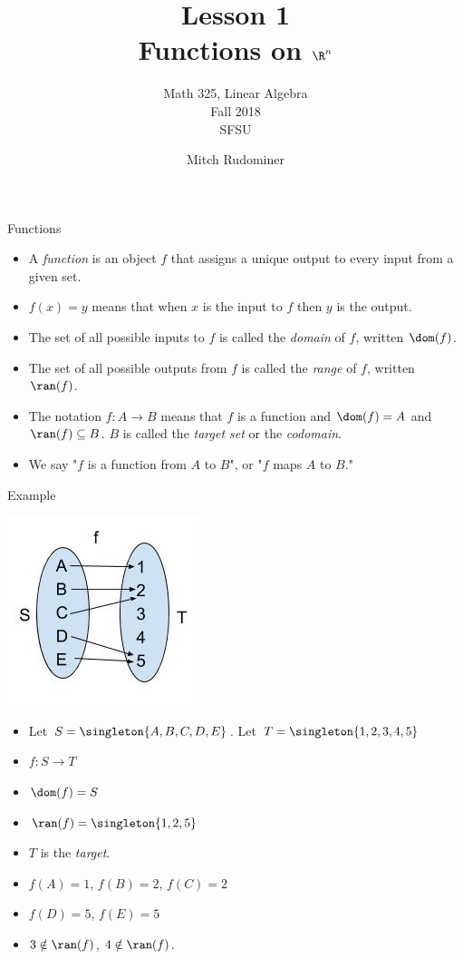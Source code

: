 \documentclass{beamer}
\title{Lesson 1 \\ Functions on $\R^n$}
\subtitle{Math 325, Linear Algebra \\ Fall 2018 \\ SFSU}
\author{Mitch Rudominer}
\date{}
\begin{document}
\begin{frame}
  \titlepage
\end{frame}


\begin{frame}{Functions}

  \begin{itemize}
  \item  A \emph{function} is an object $f$ that assigns a unique output
  to every input from a given set.
  \item $f(x) = y$ means that when $x$ is the input to $f$ then $y$ is the output.
  \item The set of all possible inputs to $f$ is called the \emph{domain} of $f$,
  written $\dom(f)$.
  \item The set of all possible outputs from $f$ is called the \emph{range} of $f$,
  written $\ran(f)$.
  \item The notation $f:A \to B$ means that $f$ is a function and
  $\dom(f)=A$ and $\ran(f)\subseteq B$. $B$ is called the \emph{target set}
  or the \emph{codomain}.
  \item We say "$f$ is a function from $A$ to $B$", or "$f$ maps $A$ to $B$."
  \end{itemize}


\end{frame}

\begin{frame}{Example}
\begin{center}
\includegraphics[scale=0.25]{function1}
\end{center}

\begin{itemize}
\item Let $S=\singleton{A,B,C,D,E}$. Let $T=\singleton{1,2,3,4,5}$
\item $f:S\to T$
\item $\dom(f) = S$
\item $\ran(f) = \singleton{1,2,5}$
\item $T$ is the \emph{target}.
\item $f(A) = 1$, $f(B) = 2$, $f(C)=2$
\item $f(D) = 5$, $f(E) = 5$
\item $3 \notin \ran(f)$, $4\notin\ran(f)$.
\end{itemize}
\end{frame}
\end{document}
